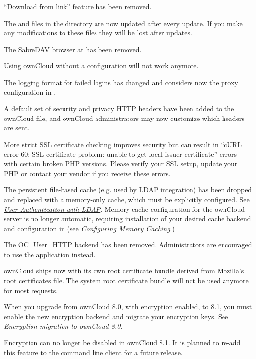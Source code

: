 \documentclass[letterpaper,10pt,english]{sphinxmanual}
\begin{document}
``Download from link'' feature has been removed.

The  and  files in the  directory are now
updated after every update. If you make any modifications to these files they
will be lost after updates.

The SabreDAV browser at  has been removed.

Using ownCloud without a  configuration will not work anymore.

The logging format for failed logins has changed and considers now the proxy
configuration in .

A default set of security and privacy HTTP headers have been added to the
ownCloud  file, and ownCloud administrators may now customize which
headers are sent.

More strict SSL certificate checking improves security but can result in
``cURL error 60: SSL certificate problem: unable to get local issuer certificate''
errors with certain broken PHP versions. Please verify your SSL setup, update your
PHP or contact your vendor if you receive these errors.

The persistent file-based cache (e.g. used by LDAP integration) has been dropped and
replaced with a memory-only cache, which must be explicitly configured. See
{\hyperref[configuration_user/user_auth_ldap::doc]{\emph{\emph{User Authentication with LDAP}}}}. Memory cache configuration for the
ownCloud server is no longer automatic, requiring installation of
your desired cache backend and configuration in
 (see {\hyperref[configuration_server/caching_configuration::doc]{\emph{\emph{Configuring Memory Caching}}}}.)

The OC\_User\_HTTP backend has been removed. Administrators are encouraged to use
the  application instead.

ownCloud ships now with its own root certificate bundle derived from Mozilla's
root certificates file. The system root certificate bundle will not be used
anymore for most requests.

When you upgrade from ownCloud 8.0, with encryption enabled, to 8.1, you must
enable the new encryption backend and migrate your encryption keys. See
{\hyperref[configuration_files/encryption_configuration:upgrading\string-encryption\string-label]{\emph{Encryption migration to ownCloud 8.0}}}.

Encryption can no longer be disabled in ownCloud 8.1. It is planned to re-add
this feature to the command line client for a future release.
\end{document}
